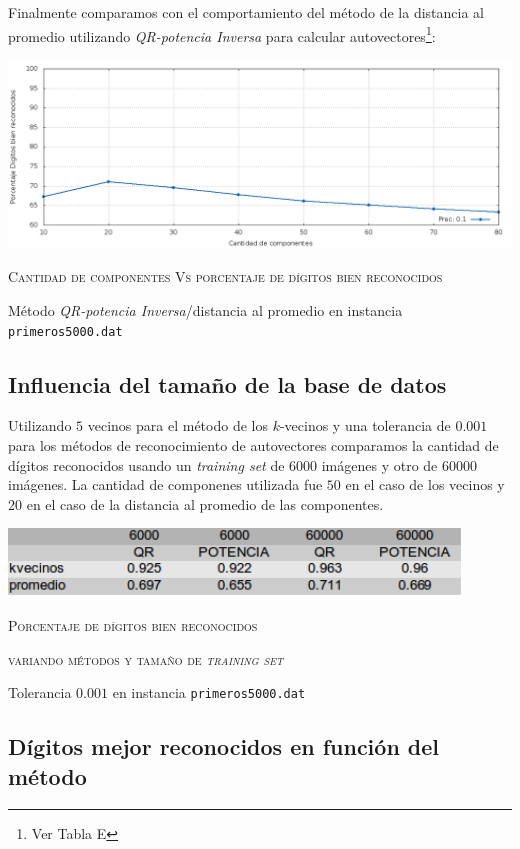 		Finalmente comparamos con el comportamiento del m\'etodo de la distancia al promedio
		utilizando \textit{QR-potencia Inversa} para calcular autovectores\footnote{ Ver Tabla E }:
	
		\vspace{5mm}
		\centerline{\includegraphics[width=20cm]{img/QRDistanciasMedias.png}}
		\centerline{\textsc{Cantidad de componentes Vs porcentaje de d\'igitos bien
		reconocidos}}
		\centerline{M\'etodo \textit{QR-potencia Inversa}/distancia al promedio en instancia \texttt{primeros5000.dat}}
		\vspace{5mm}


	\subsection{Influencia del tama\~no de la base de datos}

		Utilizando $5$ vecinos para el m\'etodo de los $k$-vecinos y una tolerancia
		de $0.001$ para los m\'etodos de reconocimiento de autovectores comparamos
		la cantidad de d\'igitos reconocidos usando un \textit{training set} de
		$6000$ im\'agenes y otro de $60000$ im\'agenes.
		La cantidad de componenes utilizada fue $50$ en el caso de los vecinos
		y $20$ en el caso de la distancia al promedio de las componentes.

		\vspace{5mm}
		\centerline{\includegraphics[width=12cm]{img/tamBaseDatos.png}}
		\centerline{\textsc{Porcentaje de d\'igitos bien reconocidos}}
		\centerline{\textsc{variando m\'etodos y tama\~no de \textit{training set}}}
		\centerline{Tolerancia $0.001$ en instancia \texttt{primeros5000.dat}}
		\vspace{5mm}


	\subsection{D\'igitos mejor reconocidos en funci\'on del m\'etodo}

